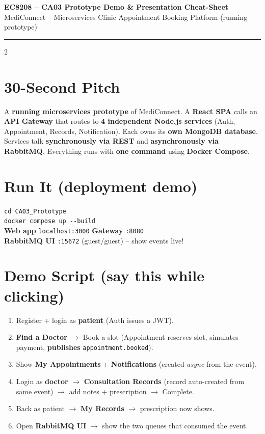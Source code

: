 \documentclass[10pt,a4paper]{article}
\newcommand{\hd}[1]{\textbf{\color{navy}#1}}
\newcommand{\code}[1]{\texttt{\footnotesize #1}}
\begin{document}
{\centering
{\large\bfseries\color{navy} EC8208 -- CA03 Prototype Demo \& Presentation Cheat-Sheet}\\
{\footnotesize\color{grayln} MediConnect -- Microservices Clinic Appointment Booking Platform (running prototype)}\par}
\vspace{2pt}
\hrule
\vspace{3pt}

\begin{multicols}{2}

\section{30-Second Pitch}
{\footnotesize A \textbf{running microservices prototype} of MediConnect. A \textbf{React SPA}
calls an \textbf{API Gateway} that routes to \textbf{4 independent Node.js services} (Auth,
Appointment, Records, Notification). Each owns its \textbf{own MongoDB database}. Services talk
\textbf{synchronously via REST} and \textbf{asynchronously via RabbitMQ}. Everything runs with
\textbf{one command} using \textbf{Docker Compose}.}

\section{Run It (deployment demo)}
{\footnotesize
\code{cd CA03\_Prototype}\\
\code{docker compose up -{}-build}\\[2pt]
\hd{Web app} \code{localhost:3000} \textbullet{} \hd{Gateway} \code{:8080}\\
\hd{RabbitMQ UI} \code{:15672} (guest/guest) -- show events live!}

\section{Demo Script (say this while clicking)}
{\footnotesize
\begin{enumerate}[leftmargin=1.3em,itemsep=0pt,topsep=1pt]
  \item Register + login as \hd{patient} (Auth issues a JWT).
  \item \hd{Find a Doctor} $\rightarrow$ Book a slot (Appointment reserves slot, simulates
        payment, \textbf{publishes} \code{appointment.booked}).
  \item Show \hd{My Appointments} + \hd{Notifications} (created \emph{async} from the event).
  \item Login as \hd{doctor} $\rightarrow$ \hd{Consultation Records} (record auto-created from
        same event) $\rightarrow$ add notes + prescription $\rightarrow$ Complete.
  \item Back as patient $\rightarrow$ \hd{My Records} $\rightarrow$ prescription now shows.
  \item Open \hd{RabbitMQ UI} $\rightarrow$ show the two queues that consumed the event.
\end{enumerate}}


\end{multicols}
\end{document}
